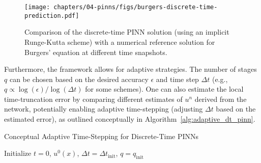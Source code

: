 \begin{figure}[htbp] %
    \centering
    \texttt{[image: chapters/04-pinns/figs/burgers-discrete-time-prediction.pdf]}
    \caption{Comparison of the discrete-time PINN solution (using an implicit Runge-Kutta scheme) with a numerical reference solution for Burgers' equation at different time snapshots.}
    \label{fig:comparison_dt} %
\end{figure}

Furthermore, the framework allows for adaptive strategies. The number of stages $q$ can be chosen based on the desired accuracy $\epsilon$ and time step $\Delta t$ (e.g., $q \propto \log(\epsilon)/\log(\Delta t)$ for some schemes). One can also estimate the local time-truncation error by comparing different estimates of $u^n$ derived from the network, potentially enabling adaptive time-stepping (adjusting $\Delta t$ based on the estimated error), as outlined conceptually in Algorithm~\ref{alg:adaptive_dt_pinn}.

\begin{algorithm}[htbp] %
\caption{Conceptual Adaptive Time-Stepping for Discrete-Time PINNs}
\label{alg:adaptive_dt_pinn}
\SetAlgoLined
Initialize $t=0$, $u^0(x)$, $\Delta t = \Delta t_\text{init}$, $q = q_\text{init}$\;
\end{algorithm}

